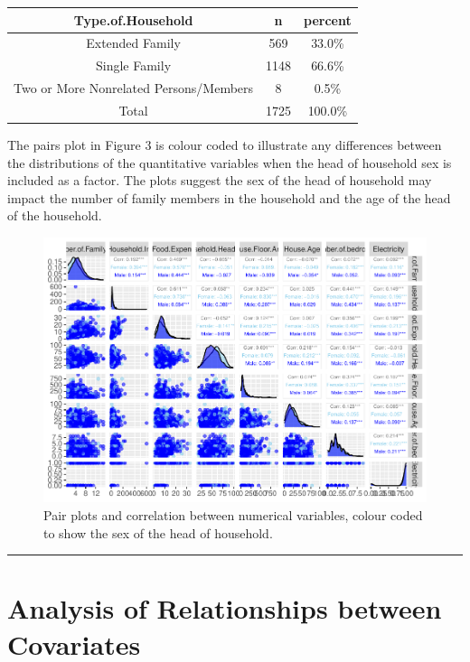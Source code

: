 \documentclass[
]{article}
\begin{document}
\begin{tabular}{ccc}
\toprule
Type.of.Household & n & percent\\
\midrule
Extended Family & 569 & 33.0\%\\
Single Family & 1148 & 66.6\%\\
Two or More Nonrelated Persons/Members & 8 & 0.5\%\\
Total & 1725 & 100.0\%\\
\bottomrule
\end{tabular}

The pairs plot in Figure 3 is colour coded to illustrate any differences
between the distributions of the quantitative variables when the head of
household sex is included as a factor. The plots suggest the sex of the
head of household may impact the number of family members in the
household and the age of the head of the household.

\begin{figure}[H]

{\centering \includegraphics[width=1\linewidth]{Group_01_files/figure-latex/pairs-1} 

}

\caption{Pair plots and correlation between numerical variables, colour coded to show the sex of the head of household.}\label{fig:pairs}
\end{figure}

\begin{center}\rule{0.5\linewidth}{0.5pt}\end{center}

\newpage

\hypertarget{sec:ARC}{%
\section{Analysis of Relationships between Covariates}\label{sec:ARC}}
\end{document}
